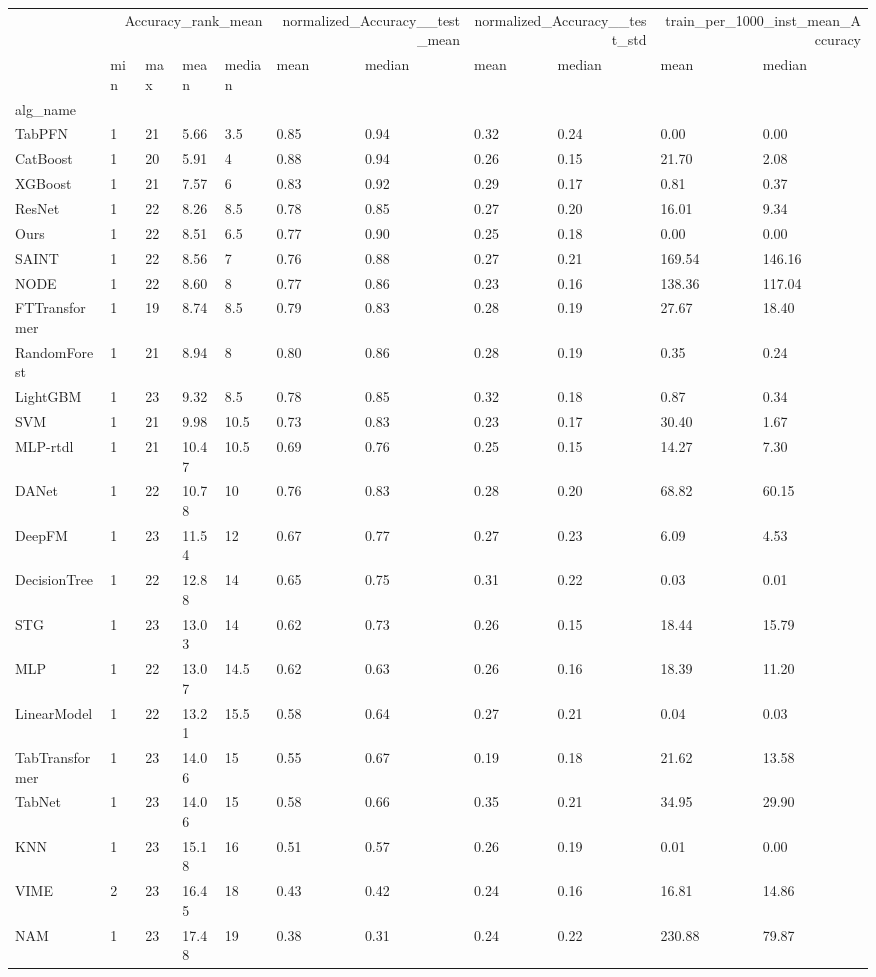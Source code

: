 \begin{tabular}{lllllllllll}
\toprule
 & \multicolumn{4}{r}{Accuracy_rank_mean} & \multicolumn{2}{r}{normalized_Accuracy__test_mean} & \multicolumn{2}{r}{normalized_Accuracy__test_std} & \multicolumn{2}{r}{train_per_1000_inst_mean_Accuracy} \\
 & min & max & mean & median & mean & median & mean & median & mean & median \\
alg_name &  &  &  &  &  &  &  &  &  &  \\
\midrule
TabPFN & 1 & 21 & 5.66 & 3.5 & 0.85 & 0.94 & 0.32 & 0.24 & 0.00 & 0.00 \\
CatBoost & 1 & 20 & 5.91 & 4 & 0.88 & 0.94 & 0.26 & 0.15 & 21.70 & 2.08 \\
XGBoost & 1 & 21 & 7.57 & 6 & 0.83 & 0.92 & 0.29 & 0.17 & 0.81 & 0.37 \\
ResNet & 1 & 22 & 8.26 & 8.5 & 0.78 & 0.85 & 0.27 & 0.20 & 16.01 & 9.34 \\
Ours & 1 & 22 & 8.51 & 6.5 & 0.77 & 0.90 & 0.25 & 0.18 & 0.00 & 0.00 \\
SAINT & 1 & 22 & 8.56 & 7 & 0.76 & 0.88 & 0.27 & 0.21 & 169.54 & 146.16 \\
NODE & 1 & 22 & 8.60 & 8 & 0.77 & 0.86 & 0.23 & 0.16 & 138.36 & 117.04 \\
FTTransformer & 1 & 19 & 8.74 & 8.5 & 0.79 & 0.83 & 0.28 & 0.19 & 27.67 & 18.40 \\
RandomForest & 1 & 21 & 8.94 & 8 & 0.80 & 0.86 & 0.28 & 0.19 & 0.35 & 0.24 \\
LightGBM & 1 & 23 & 9.32 & 8.5 & 0.78 & 0.85 & 0.32 & 0.18 & 0.87 & 0.34 \\
SVM & 1 & 21 & 9.98 & 10.5 & 0.73 & 0.83 & 0.23 & 0.17 & 30.40 & 1.67 \\
MLP-rtdl & 1 & 21 & 10.47 & 10.5 & 0.69 & 0.76 & 0.25 & 0.15 & 14.27 & 7.30 \\
DANet & 1 & 22 & 10.78 & 10 & 0.76 & 0.83 & 0.28 & 0.20 & 68.82 & 60.15 \\
DeepFM & 1 & 23 & 11.54 & 12 & 0.67 & 0.77 & 0.27 & 0.23 & 6.09 & 4.53 \\
DecisionTree & 1 & 22 & 12.88 & 14 & 0.65 & 0.75 & 0.31 & 0.22 & 0.03 & 0.01 \\
STG & 1 & 23 & 13.03 & 14 & 0.62 & 0.73 & 0.26 & 0.15 & 18.44 & 15.79 \\
MLP & 1 & 22 & 13.07 & 14.5 & 0.62 & 0.63 & 0.26 & 0.16 & 18.39 & 11.20 \\
LinearModel & 1 & 22 & 13.21 & 15.5 & 0.58 & 0.64 & 0.27 & 0.21 & 0.04 & 0.03 \\
TabTransformer & 1 & 23 & 14.06 & 15 & 0.55 & 0.67 & 0.19 & 0.18 & 21.62 & 13.58 \\
TabNet & 1 & 23 & 14.06 & 15 & 0.58 & 0.66 & 0.35 & 0.21 & 34.95 & 29.90 \\
KNN & 1 & 23 & 15.18 & 16 & 0.51 & 0.57 & 0.26 & 0.19 & 0.01 & 0.00 \\
VIME & 2 & 23 & 16.45 & 18 & 0.43 & 0.42 & 0.24 & 0.16 & 16.81 & 14.86 \\
NAM & 1 & 23 & 17.48 & 19 & 0.38 & 0.31 & 0.24 & 0.22 & 230.88 & 79.87 \\
\bottomrule
\end{tabular}
